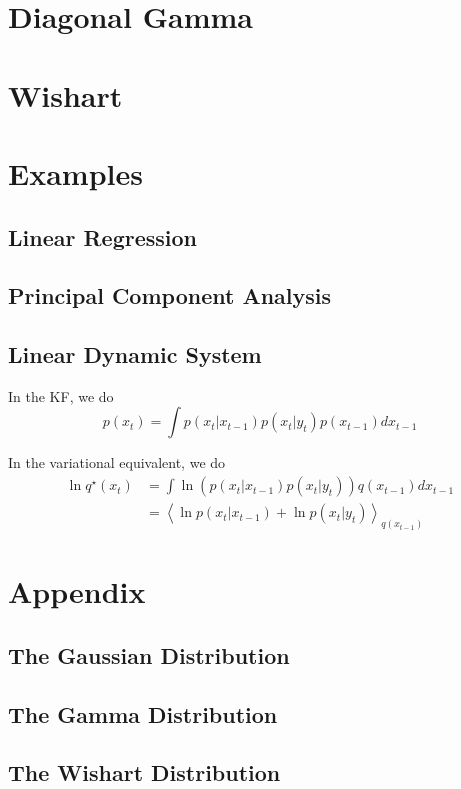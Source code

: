 \documentclass{article}
\newcommand{\<}{\langle}
\renewcommand{\>}{\rangle}
\begin{document}
\section{Diagonal Gamma}
\section{Wishart}

\section{Examples}
\subsection{Linear Regression}
\subsection{Principal Component Analysis}

\subsection{Linear Dynamic System}
\label{examples:LDS}
In the KF, we do
\begin{equation}
p(x_t) = \int p(x_t | x_{t-1}) p(x_t | y_t) p(x_{t-1}) d x_{t-1}
\end{equation}

In the variational equivalent, we do
\begin{equation}
\begin{split}
\ln q^\star(x_t) &= \int \ln \left( p(x_t | x_{t-1}) p(x_t | y_t) \right) q(x_{t-1}) d x_{t-1}\\
            &= \left<  \ln  p(x_t | x_{t-1})  + \ln p(x_t | y_t)  \right>_{q(x_{t-1})}
\end{split}
\end{equation}


\section{Appendix}
\subsection{The Gaussian Distribution}
\subsection{The Gamma Distribution}
\subsection{The Wishart Distribution}
\end{document}
